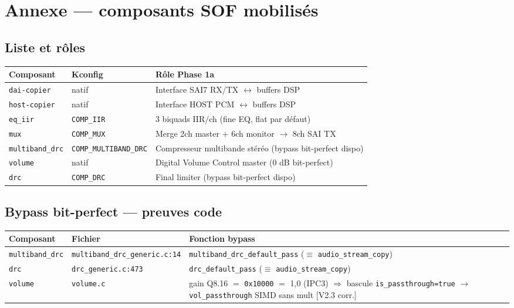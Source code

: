 \documentclass[11pt,a4paper]{article}
\begin{document}
\clearpage
\section{Annexe --- composants SOF mobilisés}

\subsection{Liste et rôles}
\begin{center}
\begin{tabularx}{\textwidth}{llX}
\toprule
\textbf{Composant} & \textbf{Kconfig} & \textbf{Rôle Phase 1a} \\
\midrule
\texttt{dai-copier} & natif & Interface SAI7 RX/TX $\leftrightarrow$ buffers DSP \\
\texttt{host-copier} & natif & Interface HOST PCM $\leftrightarrow$ buffers DSP \\
\texttt{eq\_iir} & \texttt{COMP\_IIR} & 3 biquads IIR/ch (fine EQ, flat par défaut) \\
\texttt{mux} & \texttt{COMP\_MUX} & Merge 2ch master + 6ch monitor $\rightarrow$ 8ch SAI TX \\
\texttt{multiband\_drc} & \texttt{COMP\_MULTIBAND\_DRC} & Compresseur multibande stéréo (bypass bit-perfect dispo) \\
\texttt{volume} & natif & Digital Volume Control master (0 dB bit-perfect) \\
\texttt{drc} & \texttt{COMP\_DRC} & Final limiter (bypass bit-perfect dispo) \\
\bottomrule
\end{tabularx}
\end{center}

\subsection{Bypass bit-perfect --- preuves code}
\begin{center}
\begin{tabularx}{\textwidth}{lll}
\toprule
\textbf{Composant} & \textbf{Fichier} & \textbf{Fonction bypass} \\
\midrule
\texttt{multiband\_drc} & \texttt{multiband\_drc\_generic.c:14} & \texttt{multiband\_drc\_default\_pass} ($\equiv$ \texttt{audio\_stream\_copy}) \\
\texttt{drc} & \texttt{drc\_generic.c:473} & \texttt{drc\_default\_pass} ($\equiv$ \texttt{audio\_stream\_copy}) \\
\texttt{volume} & \texttt{volume.c} & gain Q8.16 $=$ \texttt{0x10000} $=$ 1{,}0 (IPC3) $\Rightarrow$ bascule \texttt{is\_passthrough=true} $\rightarrow$ \texttt{vol\_passthrough} SIMD sans mult [V2.3 corr.] \\
\bottomrule
\end{tabularx}
\end{center}
\end{document}
